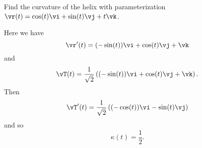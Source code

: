 \begin{activity} \label{A:9.8.7} Find the curvature of the helix with parameterization $\vr(t) = \cos(t) \vi + \sin(t) \vj + t \vk$.

\end{activity}
\begin{smallhint}

\end{smallhint}
\begin{bighint}

\end{bighint}
\begin{activitySolution}
Here we have
\[\vr'(t) = (-\sin(t)) \vi + \cos(t) \vj + \vk\]
and
\[\vT(t) = \frac{1}{\sqrt{2}}\left( (-\sin(t)) \vi + \cos(t) \vj + \vk \right).\]
Then
\[\vT'(t) = \frac{1}{\sqrt{2}}\left( (-\cos(t)) \vi - \sin(t) \vj \right)\]
and so
\[\kappa(t) = \frac{1}{2}.\]
\end{activitySolution}
\aftera
